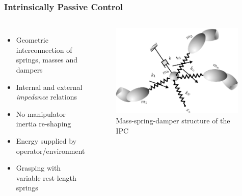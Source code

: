 \documentclass[student]{ITRslides}
\begin{document}
%			
%	
%
%		
%		
%			

\begin{frame}
	\frametitle{Intrinsically Passive Control}
\begin{columns}[t]
			
	
		\begin{itemize}
			\item Geometric interconnection of springs, masses and dampers
			\item Internal and external \emph{impedance} relations
			\item No manipulator inertia re-shaping
			\item Energy supplied by operator/environment
			\item Grasping with variable rest-length springs
		\end{itemize}

		
             \begin{figure}[htb]
			\centering
			\includegraphics[width=0.98\textwidth]{IPCsprings.png}
			\caption{Mass-spring-damper structure of the IPC \cite{Stramigioli_01}}
			\end{figure}
		
			
		\end{columns}
\end{frame}
\end{document}
